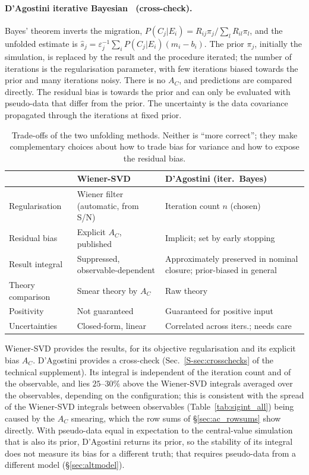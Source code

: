 \documentclass[11pt,a4paper]{article}
\newcommand{\suppref}[2]{#1~\ref{S-#2} of the technical supplement}
\begin{document}
\paragraph{D'Agostini iterative Bayesian~\cite{dagostini} (cross-check).} Bayes' theorem inverts
the migration, $P(C_j|E_i)=R_{ij}\pi_j/\sum_l R_{il}\pi_l$, and the unfolded estimate is
$\hat{s}_j=\varepsilon_j^{-1}\sum_i P(C_j|E_i)(m_i-b_i)$. The prior $\pi_j$, initially the
simulation, is replaced by the result and the procedure iterated; the number of iterations is the
regularisation parameter, with few iterations biased towards the prior and many iterations noisy.
There is no $A_C$, and predictions are compared directly. The residual bias is towards the prior and
can only be evaluated with pseudo-data that differ from the prior. The uncertainty is the data
covariance propagated through the iterations at fixed prior.

\begin{table}[H]\centering\small
\caption{Trade-offs of the two unfolding methods. Neither is ``more correct''; they make
  complementary choices about how to trade bias for variance and how to expose the
  residual bias.}
\label{tab:unfcompare}
\begin{tabular}{L{2.8cm}L{5.4cm}L{6.4cm}}
\toprule
 & \textbf{Wiener-SVD} & \textbf{D'Agostini (iter.\ Bayes)} \\
\midrule
Regularisation    & Wiener filter (automatic, from S/N) & Iteration count $n$ (chosen) \\
Residual bias     & Explicit $A_C$, published           & Implicit; set by early stopping \\
Result integral   & Suppressed, observable-dependent    & Approximately preserved in nominal closure; prior-biased in general \\
Theory comparison & Smear theory by $A_C$               & Raw theory \\
Positivity        & Not guaranteed                      & Guaranteed for positive input \\
Uncertainties     & Closed-form, linear                 & Correlated across iters.; needs care \\
\bottomrule
\end{tabular}
\end{table}

Wiener-SVD provides the results, for its objective regularisation and its explicit bias $A_C$.
D'Agostini provides a cross-check (\suppref{Sec.}{sec:crosschecks}). Its integral is independent
of the iteration count and of the observable, and lies $25$--$30\%$ above the Wiener-SVD integrals
averaged over the observables, depending on the configuration; this is consistent with the spread of the Wiener-SVD integrals
between observables (Table~\ref{tab:sigint_all}) being caused by the $A_C$ smearing, which the row
sums of \S\ref{sec:ac_rowsums} show directly. With pseudo-data equal in expectation to the
central-value simulation that is also its prior, D'Agostini returns its prior, so the
stability of its integral does not measure its bias for a different truth; that requires pseudo-data from a different model (\S\ref{sec:altmodel}).
\end{document}
